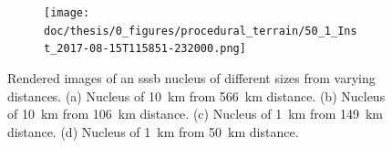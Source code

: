 \begin{figure}[htb]
\begin{subfigure}[b]{0.48\textwidth}
        \caption{}
        \label{fig:render_quali_comparison_3}
    \end{subfigure}
    \begin{subfigure}[b]{0.48\textwidth}
        \centering
        \texttt{[image: doc/thesis/0\_figures/procedural\_terrain/50\_1\_Inst\_2017-08-15T115851-232000.png]}
        \caption{}
        \label{fig:render_quali_comparison_4}
    \end{subfigure}
    \caption{Rendered images of an \gls{sssb} nucleus of different sizes from varying distances. (a) Nucleus of \SI{10}{\kilo\meter} from \SI{566}{\kilo\meter} distance. (b) Nucleus of \SI{10}{\kilo\meter} from \SI{106}{\kilo\meter} distance. (c) Nucleus of \SI{1}{\kilo\meter} from \SI{149}{\kilo\meter} distance. (d) Nucleus of \SI{1}{\kilo\meter} from \SI{50}{\kilo\meter} distance.}
    \label{fig:render_quali_comparison}
\end{figure}

